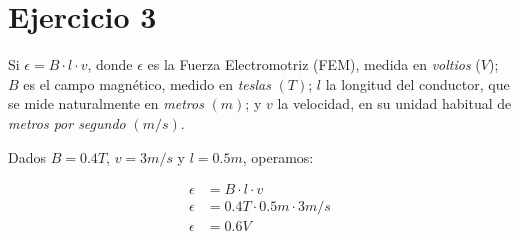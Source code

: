 \section{Ejercicio 3}

Si \(\epsilon = B\cdot l\cdot v\),
donde \(\epsilon\) es la Fuerza Electromotriz (FEM),
medida en \textit{voltios} (\(V\));
\(B\) es el campo magnético,
medido en \textit{teslas} \((T)\);
\(l\) la longitud del conductor,
que se mide naturalmente en \textit{metros} \((m)\);
y \(v\) la velocidad, 
en su unidad habitual de \textit{metros por segundo} \((m/s)\).

Dados \(B=0.4T\), \(v=3m/s\) y \(l=0.5m\), operamos:

\begin{align*}
    \epsilon &= B\cdot l\cdot v \\
    \epsilon &= 0.4T \cdot 0.5m \cdot 3 m/s \\
    \epsilon &= \boxed{0.6V}
\end{align*}